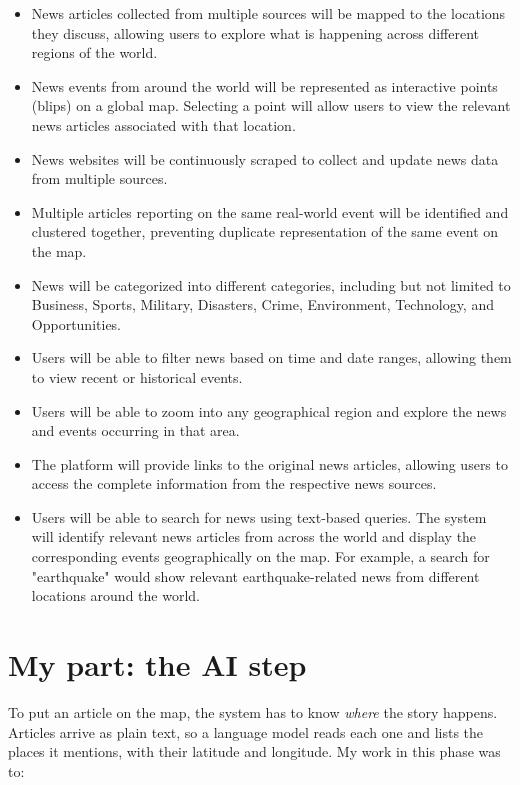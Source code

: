 \documentclass[11pt,a4paper]{article}
\begin{document}
\begin{itemize}
    \item News articles collected from multiple sources will be mapped to the locations they discuss, allowing users to explore what is happening across different regions of the world.
    \item News events from around the world will be represented as interactive points (blips) on a global map. Selecting a point will allow users to view the relevant news articles associated with that location.
    \item News websites will be continuously scraped to collect and update news data from multiple sources.
    \item Multiple articles reporting on the same real-world event will be identified and clustered together, preventing duplicate representation of the same event on the map.
    \item News will be categorized into different categories, including but not limited to Business, Sports, Military, Disasters, Crime, Environment, Technology, and Opportunities.
    \item Users will be able to filter news based on time and date ranges, allowing them to view recent or historical events.
    \item Users will be able to zoom into any geographical region and explore the news and events occurring in that area.
    \item The platform will provide links to the original news articles, allowing users to access the complete information from the respective news sources.
    \item Users will be able to search for news using text-based queries. The system will identify relevant news articles from across the world and display the corresponding events geographically on the map. For example, a search for "earthquake" would show relevant earthquake-related news from different locations around the world.
\end{itemize}

\section{My part: the AI step}

To put an article on the map, the system has to know \emph{where} the story
happens. Articles arrive as plain text, so a language model reads each one and
lists the places it mentions, with their latitude and longitude. My work in
this phase was to:
\end{document}
